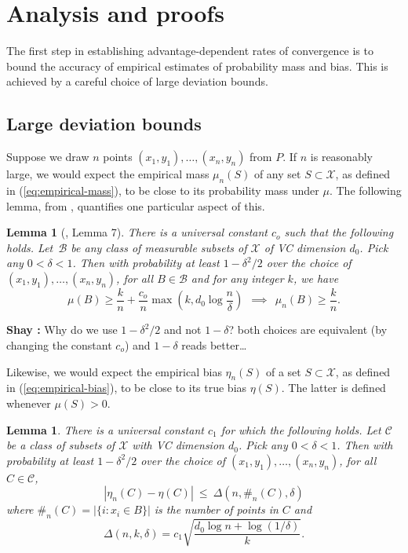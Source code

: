 \documentclass{article}
\def\X{{\mathcal X}}
\def\B{{\mathcal B}}
\newtheorem{lemma}[theorem]{Lemma}
\newcommand{\comment}[3]{{\color{#1} {\bf #2 :} #3}}
\newcommand{\shay}[1]{\comment{purple}{Shay}{#1}}
\begin{document}
\appendix

\section{Analysis and proofs}\label{sec:gen3}
\label{sec:proof-outline}

The first step in establishing advantage-dependent rates of convergence is to bound the accuracy of empirical estimates of probability mass and bias. This is achieved by a careful choice of large deviation bounds.

\subsection{Large deviation bounds}

Suppose we draw $n$ points $(x_1, y_1), \ldots, (x_n, y_n)$ from $P$. If $n$ is reasonably large, we would expect the empirical mass $\mu_n(S)$ of any set $S \subset \X$, as defined in (\ref{eq:empirical-mass}), to be close to its probability mass under $\mu$. The following lemma, from \cite{ChaudhuriDasgupta2010}, quantifies one particular aspect of this.
\begin{lemma}[\cite{ChaudhuriDasgupta2010}, Lemma 7]
There is a universal constant $c_o$ such that the following holds. Let~$\B$ be any class of measurable subsets of $\X$ of VC dimension $d_0$. Pick any $0 < \delta < 1$. Then with probability at least $1-\delta^2/2$ over the choice of $(x_1, y_1), \ldots, (x_n, y_n)$, for all $B \in \B$ and for any integer $k$, we have
$$ \mu(B) \geq \frac{k}{n} + \frac{c_o}{n} \max \left( k, d_0 \log \frac{n}{\delta} \right)
\ \ \implies \ \ 
\mu_{n}(B) \geq \frac{k}{n} .$$
\label{lemma:points-in-balls}
\end{lemma}

\shay{Why do we use $1-\delta^2/2$ and not $1-\delta$? 
both choices are equivalent (by changing the constant $c_o$)
and $1-\delta$ reads better\ldots }


Likewise, we would expect the empirical bias $\eta_n(S)$ of a set $S \subset \X$, as defined in (\ref{eq:empirical-bias}), to be close to its true bias $\eta(S)$. The latter is defined whenever $\mu(S) > 0$.
\begin{lemma}
There is a universal constant $c_1$ for which the following holds. Let $\mathcal{C}$ be a class of subsets of $\X$ with VC dimension $d_0$. Pick any $0 < \delta < 1$. Then with probability at least $1-\delta^2/2$ over the choice of $(x_1, y_1), \ldots, (x_n, y_n)$, for all $C \in \mathcal{C}$,
  $$ \left| \eta_n(C) - \eta(C) \right| \ \leq \ \Delta(n, \#_n(C), \delta) $$
where $\#_n(C) = |\{i: x_i \in B\}|$ is the number of points in $C$ and 
\begin{equation}
\Delta(n,k,\delta) = c_1 \sqrt{\frac{d_0 \log n + \log (1/\delta)}{k}} .
\label{eq:delta-defn}
\end{equation}
\label{lemma:bias}
\end{lemma}
\end{document}
